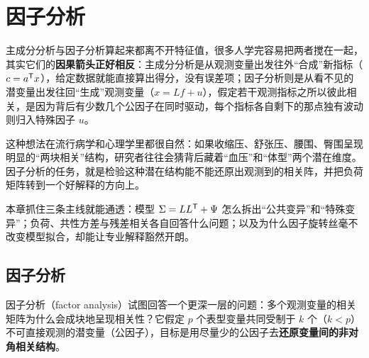 \chapter{因子分析}
主成分分析与因子分析算起来都离不开特征值，很多人学完容易把两者搅在一起，其实它们的\textbf{因果箭头正好相反}：主成分分析是从观测变量出发往外“合成”新指标（$c=a^{\mathsf T} x$），给定数据就能直接算出得分，没有误差项；因子分析则是从看不见的潜变量出发往回“生成”观测变量（$x=Lf+u$），假定若干观测指标之所以彼此相关，是因为背后有少数几个公因子在同时驱动，每个指标各自剩下的那点独有波动则归入特殊因子 $u$。

这种想法在流行病学和心理学里都很自然：如果收缩压、舒张压、腰围、臀围呈现明显的“两块相关”结构，研究者往往会猜背后藏着“血压”和“体型”两个潜在维度。因子分析的任务，就是检验这种潜在结构能不能还原出观测到的相关阵，并把负荷矩阵转到一个好解释的方向上。

本章抓住三条主线就能通透：模型 $\Sigma=LL^{\mathsf T}+\Psi$ 怎么拆出“公共变异”和“特殊变异”；负荷、共性方差与残差相关各自回答什么问题；以及为什么因子旋转丝毫不改变模型拟合，却能让专业解释豁然开朗。
\section{因子分析}
因子分析（factor analysis）试图回答一个更深一层的问题：多个观测变量的相关矩阵为什么会成块地呈现相关性？它假定 $p$ 个表型变量共同受制于 $k$ 个（$k<p$）不可直接观测的潜变量（公因子），目标是用尽量少的公因子去\textbf{还原变量间的非对角相关结构}。
